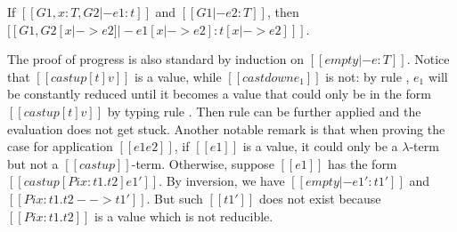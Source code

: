 \begin{lemma}\label{lem:ecore:subst}
  If $[[G1, x:T, G2 |- e1:t]]$ and $[[G1 |- e2:T]]$, then
  $[[G1, G2 [x |-> e2] |- e1[x |-> e2] : t[x |-> e2] ]]$.
\end{lemma}

The proof of progress is also standard by induction on
$[[empty |- e : T]]$. Notice that $[[castup [t] v]]$ is a value, while
$[[castdown e_1]]$ is not: by rule , $e_1$ will
be constantly reduced until it becomes a value that could only be in
the form $[[castup [t] v]]$ by typing rule . Then
rule  can be further applied and the evaluation
does not get stuck. Another notable remark is that
when proving the case for application $[[e1 e2]]$, if $[[e1]]$ is a
value, it could only be a $\lambda$-term but not a
$[[castup]]$-term. Otherwise, suppose $[[e1]]$ has the form
$[[castup [Pi x:t1.t2] e1']]$. By inversion, we have
$[[empty |- e1' : t1']]$ and $[[Pi x:t1.t2 --> t1']]$. But such
$[[t1']]$ does not exist because $[[Pi x:t1.t2]]$ is a value which is
not reducible.

